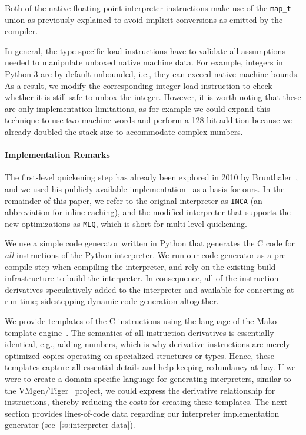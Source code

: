 \documentclass[preprint,10pt]{popl14conf}
\newcommand{\inca}{\texttt{INCA}}
\newcommand{\mlq}{\texttt{MLQ}}
\begin{document}
Both of the native floating point interpreter instructions make use of the \texttt{map_t}
union as previously explained to avoid implicit conversions as emitted by the compiler.

In general, the type-specific load instructions have to validate all assumptions needed to
manipulate unboxed native machine data.
For example, integers in Python 3 are by default unbounded, i.e., they can exceed native machine
bounds.
As a result, we modify the corresponding integer load instruction to check whether it is still safe
to unbox the integer.
However, it is worth noting that these are only implementation limitations, as for example we could
expand this technique to use two machine words and perform a 128-bit addition because we already
doubled the stack size to accommodate complex numbers.

\paragraph{Implementation Remarks}
The first-level quickening step has already been explored in 2010 by
Brunthaler~\cite{brunthaler+10a,brunthaler+10b}, and we used his publicly available
implementation~\cite{brunthaler+12} as a basis for ours.
In the remainder of this paper, we refer to the original interpreter as \inca{} (an abbreviation for
inline caching), and the modified interpreter that supports the new optimizations as \mlq{}, which
is short for multi-level quickening.

We use a simple code generator written in Python that generates the C code for \emph{all}
instructions of the Python interpreter.
We run our code generator as a pre-compile step when compiling the interpreter, and rely on the
existing build infrastructure to build the interpreter.
In consequence, all of the instruction derivatives speculatively added to the interpreter and
available for concerting at run-time; sidestepping dynamic code generation altogether.

We provide templates of the C instructions using the language of the Mako template
engine~\cite{bayer+13}.
The semantics of all instruction derivatives is essentially identical, e.g., adding numbers, which
is why derivative instructions are merely optimized copies operating on specialized structures or
types.
Hence, these templates capture all essential details and help keeping redundancy at bay.
If we were to create a domain-specific language for generating interpreters, similar to the
VMgen/Tiger~\cite{ertl.etal+02,casey.etal+05a} project, we could express the derivative relationship
for instructions, thereby reducing the costs for creating these templates.
The next section provides lines-of-code data regarding our interpreter implementation generator
(see~\autoref{ss:interpreter-data}).
\end{document}
